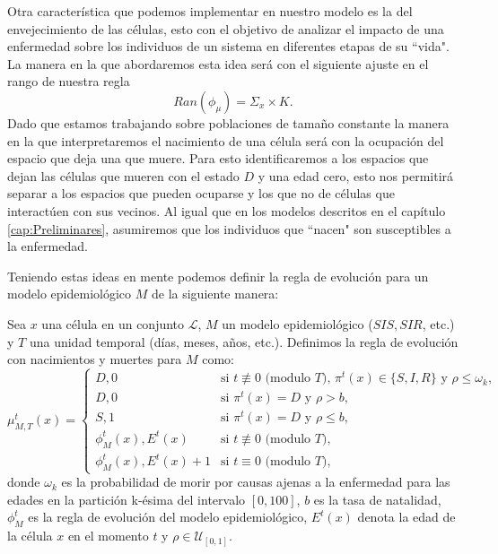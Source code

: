 Otra característica que podemos implementar en nuestro modelo es la del envejecimiento de las células, esto con el objetivo de analizar el impacto de una enfermedad sobre los individuos de un sistema en diferentes etapas de su ``vida". La manera en la que abordaremos esta idea será con el siguiente ajuste en el rango de nuestra regla
$$Ran(\phi_\mu)=\Sigma_x\times K.$$
Dado que estamos trabajando sobre poblaciones de tamaño constante la manera en la que interpretaremos el nacimiento de una célula será con la ocupación del espacio que deja una que muere. Para esto identificaremos a los espacios que dejan las células que mueren con el estado $D$ y una edad cero, esto nos permitirá separar a los espacios que pueden ocuparse y los que no de células que interactúen con sus vecinos. Al igual que en los modelos descritos en el capítulo \ref{cap:Preliminares}, asumiremos que los individuos que ``nacen" son susceptibles a la enfermedad.

Teniendo estas ideas en mente podemos definir la regla de evolución para un modelo epidemiológico $M$ de la siguiente manera:

\begin{definition}\label{def:reglaNatalidadyMortalidad}
Sea $x$ una célula en un conjunto $\mathcal{L}$, $M$ un modelo epidemiológico ($SIS, SIR$, etc.) y $T$ una unidad temporal (días, meses, años, etc.). Definimos la regla de evolución con nacimientos y muertes para $M$ como:
\begin{equation}
    \mu_{M,T}^t(x)=\left\{\begin{array}{ll}
        D,0 & \text{si }t\not\equiv 0 \text{ (modulo }T\text{), }\pi^t(x)\in\{S,I,R\}\text{ y }\rho\leq\omega_k, \\
        D,0 & \text{si }\pi^t(x)=D\text{ y }\rho>b,\\
        S,1 & \text{si }\pi^t(x)=D\text{ y }\rho\leq b,\\
        \phi_M^t(x),E^t(x) & \text{si }t\not\equiv 0 \text{ (modulo }T),\\
        \phi_M^t(x),E^t(x)+1 & \text{si }t\equiv 0 \text{ (modulo }T),
    \end{array}\right.
\end{equation}
donde $\omega_k$ es la probabilidad de morir por causas ajenas a la enfermedad para las edades en la partición k-ésima del intervalo $[0,100]$, $b$ es la tasa de natalidad, $\phi_M^t$ es la regla de evolución del modelo epidemiológico, $E^t(x)$ denota la edad de la célula $x$ en el momento $t$ y $\rho\in\mathcal{U}_{[0,1]}$.
\end{definition}

